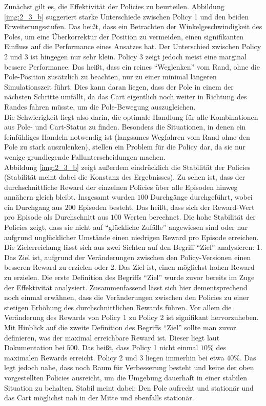 \documentclass[11pt]{article}
\begin{document}
Zunächst gilt es, die Effektivität der Policies zu beurteilen. Abbildung \ref{img:2_3_b} suggeriert starke Unterschiede zwischen Policy 1 und den beiden Erweiterungsstufen. Das heißt, dass ein Betrachten der Winkelgeschwindigkeit des Poles, um eine Überkorrektur der Position zu vermeiden, einen signifikanten Einfluss auf die Performance eines Ansatzes hat. Der Unterschied zwischen Policy 2 und 3 ist hingegen nur sehr klein. Policy 3 zeigt jedoch meist eine marginal bessere Performance. Das heißt, dass ein reines ``Weglenken'' vom Rand, ohne die Pole-Position zusätzlich zu beachten, nur zu einer minimal längeren Simulationszeit führt. Dies kann daran liegen, dass der Pole in einem der nächsten Schritte umfällt, da das Cart eigentlich noch weiter in Richtung des Randes fahren müsste, um die Pole-Bewegung auszugleichen.\\
Die Schwierigkeit liegt also darin, die optimale Handlung für alle Kombinationen aus Pole- und Cart-Status zu finden. Besonders die Situationen, in denen ein feinfühliges Handeln notwendig ist (langsames Wegfahren vom Rand ohne den Pole zu stark auszulenken), stellen ein Problem für die Policy dar, da sie nur wenige grundlegende Fallunterscheidungen machen.\\
Abbildung \ref{img:2_3_b} zeigt außerdem eindrücklich die Stabilität der Policies (Stabilität meint dabei die Konstanz des Ergebnisses). Zu sehen ist, dass der durchschnittliche Reward der einzelnen Policies über alle Episoden hinweg annähern gleich bleibt. Insgesamt wurden $100$ Durchgänge durchgeführt, wobei ein Durchgang aus $200$ Episoden besteht. Das heißt, dass sich der Reward-Wert pro Episode als Durchschnitt aus $100$ Werten berechnet. Die hohe Stabilität der Policies zeigt, dass sie nicht auf ``glückliche Zufälle'' angewiesen sind oder nur aufgrund unglücklicher Umstände einen niedrigen Reward pro Episode erreichen.\\
Die Zielerreichung lässt sich aus zwei Sichten auf den Begriff ``Ziel'' analysieren: 1. Das Ziel ist, aufgrund der Veränderungen zwischen den Policy-Versionen einen besseren Reward zu erzielen oder 2. Das Ziel ist, einen möglichst hohen Reward zu erzielen. Die erste Definition des Begriffs ``Ziel'' wurde zuvor bereits im Zuge der Effektivität analysiert. Zusammenfassend lässt sich hier dementsprechend noch einmal erwähnen, dass die Veränderungen zwischen den Policies zu einer stetigen Erhöhung des durchschnittlichen Rewards führen. Vor allem die Veränderung des Rewards von Policy 1 zu Policy 2 ist signifikant hervorzuheben. Mit Hinblick auf die zweite Definition des Begriffs ``Ziel'' sollte man zuvor definieren, was der maximal erreichbare Reward ist. Dieser liegt laut Dokumentation bei $500$. Das heißt, dass Policy 1 nicht einmal $10\%$ des maximalen Rewards erreicht. Policy 2 und 3 liegen immerhin bei etwa $40\%$. Das legt jedoch nahe, dass noch Raum für Verbesserung besteht und keine der oben vorgestellten Policies ausreicht, um die Umgebung dauerhaft in einer stabilen Situation zu behalten. Stabil meint dabei: Den Pole aufrecht und stationär und das Cart möglichst nah in der Mitte und ebenfalls stationär. 
\end{document}
